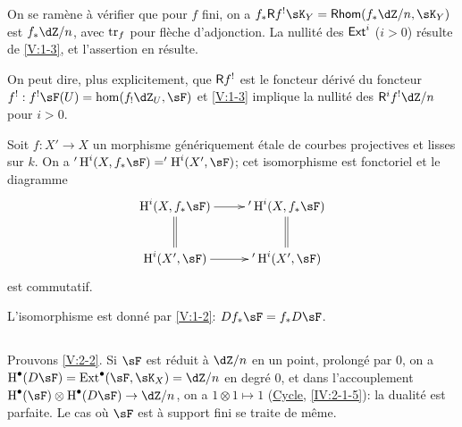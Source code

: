 On se ramène à vérifier que pour $f$ fini, on a 
$f_\ast \R f^!\sK_Y = \rHom(f_\ast\dZ/n,\sK_Y)$ est $f_\ast\dZ/n$, avec $\operatorname{tr}_f$ 
pour flèche d'adjonction. La nullité des $\operatorname{\mathsf{Ext}}^i$ ($i>0$) résulte de 
\ref{V:1-3}, et l'assertion en résulte. 

On peut dire, plus explicitement, que $\mathsf{R} f^!$ est le foncteur dérivé du 
foncteur $f^!:f^!\sF(U)=\hom(f_!\dZ_U,\sF)$ et \ref{V:1-3} implique la 
nullité des $\R^i f^!\dZ/n$ pour $i>0$.





\begin{corollary_}\label{V:2-4}
Soit $f:X'\to X$ un morphisme génériquement étale de courbes 
projectives et lisses sur $k$. On a $'\h^i(X,f_\ast \sF)='\h^i(X',\sF)$; cet 
isomorphisme est fonctoriel et le diagramme 
\[\xymatrix{
  \h^i(X,f_\ast\sF) \ar[r] \ar@{=}[d] 
    & '\h^i(X,f_\ast\sF) \ar@{=}[d] \\
  \h^i(X',\sF) \ar[r] 
    & '\h^i(X',\sF) 
}\]
est commutatif.
\end{corollary_}

L'isomorphisme est donné par \ref{V:1-2}: $D f_\ast\sF=f_\ast D\sF$. 





\subsection{}\label{V:2-5}

Prouvons \ref{V:2-2}. Si $\sF$ est réduit à $\dZ/n$ en un point, prolongé 
par $0$, on a $\h^\bullet(D\sF) = \ext^\bullet(\sF,\sK_X)=\dZ/n$ en degré 
$0$, et dans l'accouplement $\h^\bullet(\sF)\otimes\h^\bullet(D\sF) \to \dZ/n$, 
on a $1\otimes 1\mapsto 1$ (\hyperref[IV]{Cycle}, \ref{IV:2-1-5}): la dualité 
est parfaite. Le cas où $\sF$ est à support fini se traite de même. 

